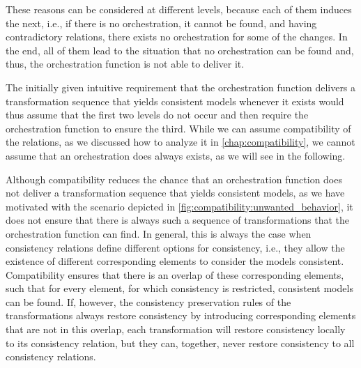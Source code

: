These reasons can be considered at different levels, because each of them induces the next, i.e., if there is no orchestration, it cannot be found, and having contradictory relations, there exists no orchestration for some of the changes.
In the end, all of them lead to the situation that no orchestration can be found and, thus, the orchestration function is not able to deliver it.

The initially given intuitive requirement that the orchestration function delivers a transformation sequence that yields consistent models whenever it exists would thus assume that the first two levels do not occur and then require the orchestration function to ensure the third.
While we can assume compatibility of the relations, as we discussed how to analyze it in \autoref{chap:compatibility}, we cannot assume that an orchestration does always exists, as we will see in the following.

Although compatibility reduces the chance that an orchestration function does not deliver a transformation sequence that yields consistent models, as we have motivated with the scenario depicted in \autoref{fig:compatibility:unwanted_behavior}, it does not ensure that there is always such a sequence of transformations that the orchestration function can find.
In general, this is always the case when consistency relations define different options for consistency, i.e., they allow the existence of different corresponding elements to consider the models consistent.
Compatibility ensures that there is an overlap of these corresponding elements, such that for every element, for which consistency is restricted, consistent models can be found.
If, however, the consistency preservation rules of the transformations always restore consistency by introducing corresponding elements that are not in this overlap, each transformation will restore consistency locally to its consistency relation, but they can, together, never restore consistency to all consistency relations.


